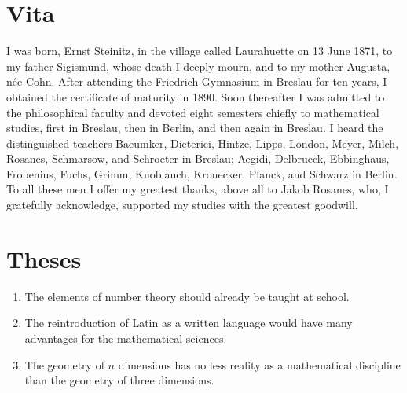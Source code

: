 \documentclass[11pt]{article}
\begin{document}
\section*{Vita}
I was born, Ernst Steinitz, in the village called Laurahuette on 13 June 1871, to my father Sigismund, whose death I deeply mourn, and to my mother Augusta, née Cohn. After attending the Friedrich Gymnasium in Breslau for ten years, I obtained the certificate of maturity in 1890. Soon thereafter I was admitted to the philosophical faculty and devoted eight semesters chiefly to mathematical studies, first in Breslau, then in Berlin, and then again in Breslau. I heard the distinguished teachers Baeumker, Dieterici, Hintze, Lipps, London, Meyer, Milch, Rosanes, Schmarsow, and Schroeter in Breslau; Aegidi, Delbrueck, Ebbinghaus, Frobenius, Fuchs, Grimm, Knoblauch, Kronecker, Planck, and Schwarz in Berlin. To all these men I offer my greatest thanks, above all to Jakob Rosanes, who, I gratefully acknowledge, supported my studies with the greatest goodwill.

\section*{Theses}
\begin{enumerate}
\item The elements of number theory should already be taught at school.
\item The reintroduction of Latin as a written language would have many advantages for the mathematical sciences.
\item The geometry of $n$ dimensions has no less reality as a mathematical discipline than the geometry of three dimensions.
\end{enumerate}
\end{document}
